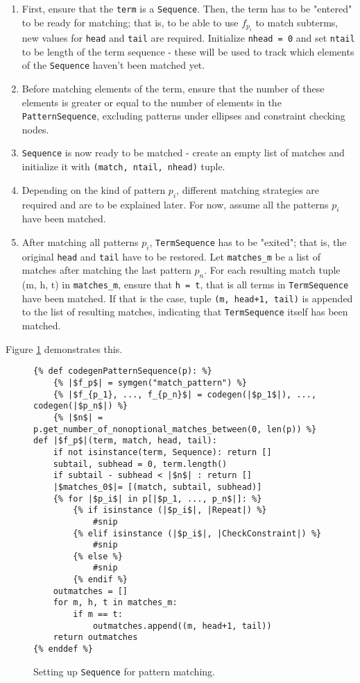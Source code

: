 \begin{enumerate}
\item
First, ensure that the \texttt{term} is a \texttt{Sequence}.  Then, the term has to be "entered" to be ready for matching; that is, to be able to use $f_{p_i}$ to match subterms, new values for \texttt{head} and \texttt{tail} are required. Initialize \texttt{nhead = 0} and set \texttt{ntail} to be length of the term sequence - these will be used to track which elements of the \texttt{Sequence} haven't been matched yet.
\item Before matching elements of the term, ensure that the number of these elements is greater or equal to the number of elements in the \texttt{PatternSequence}, excluding patterns under ellipses and constraint checking nodes.
\item \texttt{Sequence} is now ready to be matched - create an empty list of matches and initialize it with \texttt{(match, ntail, nhead)} tuple.
\item
Depending on the kind of pattern $p_i$, different matching strategies are required and are to be explained later. For now, assume all the patterns $p_i$ have been matched.
\item
After matching all patterns $p_i$, \texttt{TermSequence} has to be "exited"; that is, the original \texttt{head} and \texttt{tail} have to be restored. Let \texttt{matches\_m} be a list of matches after matching the last pattern $p_n$. For each resulting match tuple (m, h, t) in \texttt{matches\_m}, ensure that \texttt{h = t}, that is all terms in \texttt{TermSequence} have been matched. If that is the case, tuple \texttt{(m, head+1, tail)} is appended to the list of resulting matches, indicating that \texttt{TermSequence} itself has been matched.
\end{enumerate}
Figure \ref{codegen-pattern-seq-1} demonstrates this.

\begin{figure}[htb]
\centering
\begin{verbatim}
{% def codegenPatternSequence(p): %}
	{% |$f_p$| = symgen("match_pattern") %}
	{% |$f_{p_1}, ..., f_{p_n}$| = codegen(|$p_1$|), ...,  codegen(|$p_n$|) %}
	{% |$n$| = p.get_number_of_nonoptional_matches_between(0, len(p)) %}
def |$f_p$|(term, match, head, tail):
	if not isinstance(term, Sequence): return []
	subtail, subhead = 0, term.length()
	if subtail - subhead < |$n$| : return []
	|$matches_0$|= [(match, subtail, subhead)]
	{% for |$p_i$| in p[|$p_1, ..., p_n$|]: %}
		{% if isinstance (|$p_i$|, |Repeat|) %}
			#snip
		{% elif isinstance (|$p_i$|, |CheckConstraint|) %}
			#snip
		{% else %}
			#snip
		{% endif %}
	outmatches = []
	for m, h, t in matches_m:
		if m == t:
			outmatches.append((m, head+1, tail))
	return outmatches
{% enddef %}
\end{verbatim}
\caption{Setting up \texttt{Sequence} for pattern matching.}
\label{codegen-pattern-seq-1}
\end{figure}


